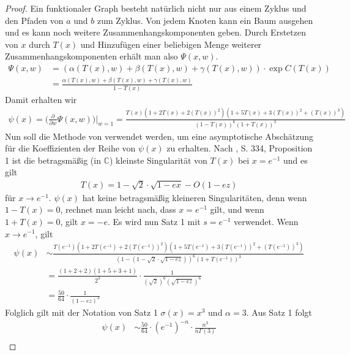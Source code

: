 \documentclass[a4paper, 10pt, ngerman]{article}
\newcommand{\C}{\mathbb{C}}
\begin{document}
\begin{proof}
    Ein funktionaler Graph besteht natürlich nicht nur aus einem Zyklus und den Pfaden von $a$ und $b$ zum Zyklus. Von jedem Knoten kann ein Baum ausgehen und es kann noch weitere Zusammenhangskomponenten geben. Durch Erstetzen von $x$ durch $T(x)$ und Hinzufügen einer beliebigen Menge weiterer Zusammenhangskomponenten erhält man also $\Psi(x, w)$.
    \begin{align*}
        \Psi(x, w)
         & = (\alpha(T(x), w) + \beta(T(x), w) + \gamma(T(x), w)) \cdot \exp C(T(x)) \\
         & = \frac {\alpha(T(x), w) + \beta(T(x), w) + \gamma(T(x), w)} {1 - T(x)}
    \end{align*}
    Damit erhalten wir
    \begin{align*}
        \psi(x) = \Bigg (\frac {\partial} {\partial w} \Psi(x, w) \Bigg ) \Bigg \vert_{w = 1} = \frac {T(x)(1 + 2T(x) + 2(T(x))^2)(1 + 5T(x) + 3(T(x))^2 + (T(x))^3)} {(1 - T(x))^6(1 + T(x))^3}
    \end{align*}
    Nun soll die Methode von \cite{fo90} verwendet werden, um eine asymptotische Abschätzung für die Koeffizienten der Reihe von $\psi(x)$ zu erhalten. Nach \cite{fo90}, S. 334, Proposition 1 ist die betragsmäßig (in $\C$) kleinste Singularität von $T(x)$ bei $x = e^{-1}$ und es gilt
    \begin{align*}
        T(x) = 1 - \sqrt{2}\cdot \sqrt {1 - ex} - O(1 - ez)
    \end{align*}
    für $x \to e^{-1}$. $\psi(x)$ hat keine betragsmäßig kleineren Singularitäten, denn wenn $1 - T(x) = 0$, rechnet man leicht nach, dass $x = e^{-1}$ gilt, und wenn $1 + T(x) = 0$, gilt $x = -e$. Es wird nun Satz 1 mit $s = e^{-1}$ verwendet. Wenn $x \to e^{-1}$, gilt
    \begin{align*}
        \psi(x)
         & \sim \frac {T(e^{-1})(1 + 2T(e^{-1}) + 2(T(e^{-1}))^2)(1 + 5T(e^{-1}) + 3(T(e^{-1}))^2 + (T(e^{-1}))^3)} {(1 - (1 - \sqrt 2 \cdot \sqrt {1 - ez}))^6(1 + T(e^{-1}))^3} \\
         & = \frac {(1 + 2 + 2)(1 + 5 + 3 + 1)} {2^3} \cdot \frac 1 {(\sqrt 2 )^6 (\sqrt{1 - ez})^6}                                                                              \\
         & = \frac {50} {64} \cdot \frac 1 {(1 - ez)^3}
    \end{align*}
    Folglich gilt mit der Notation von Satz 1 $\sigma(x) = x^3$ und $\alpha = 3$. Aus Satz 1 folgt
    \begin{align*}
        [x^n] \psi(x)
         & \sim \frac {50} {64} \cdot (e^{-1})^{-n} \cdot \frac {n^3} {n \Gamma(3)} \\

\end{align*}
\end{proof}
\end{document}
